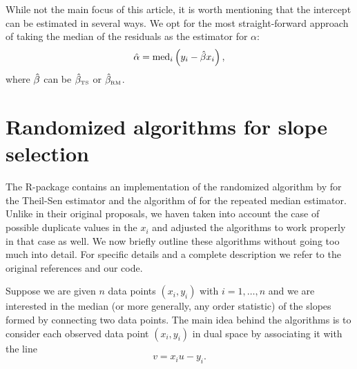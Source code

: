 While not the main focus of this article, it is worth mentioning that the intercept can be estimated in several ways. We opt for the most straight-forward approach of taking the median of the residuals as the estimator for $\alpha$:
\begin{equation*}
\alphah = \med_i \left(y_i - \betah x_i\right),
\end{equation*}
where $\hat{\beta}$ can be $\hat{\beta}_{ \mbox{\tiny TS}}$ or $\hat{\beta}_{\mbox{\tiny RM}}$.\par

\section{Randomized algorithms for slope selection}\label{sec:algo}
The R-package  contains an implementation of the randomized algorithm by \citet{matouvsek1991randomized} for the Theil-Sen estimator and 
the algorithm of \citet{matouvsek1993efficient, matouvsek1998efficient} for the repeated median estimator. Unlike in their original proposals, we haven taken into account the case of possible duplicate values in the $x_i$ and adjusted the algorithms to work properly in that case as well. We now briefly outline these algorithms without going too much into detail. For specific details and a complete description we refer to the original references and our code.\par
Suppose we are given $n$ data points $(x_i, y_i)$ with $i = 1,\ldots,n$ and we are interested in the median (or more generally, any order statistic) of the slopes formed by connecting two data points. The main idea behind the algorithms is to consider each observed data point $(x_i, y_i)$ in dual space by associating it with the line 
$$v = x_i u - y_i.$$
